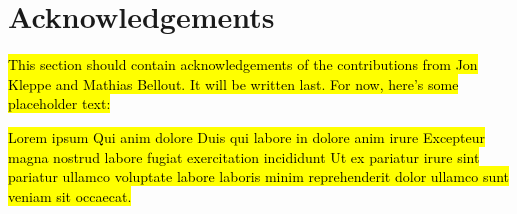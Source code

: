 
\section*{Acknowledgements} %
\hl{This section should contain acknowledgements of the contributions from Jon Kleppe and Mathias Bellout. It will be written last. For now, here's some placeholder text:}

\hl{Lorem ipsum Qui anim dolore Duis qui labore in dolore anim irure Excepteur magna nostrud labore fugiat exercitation incididunt Ut ex pariatur irure sint pariatur ullamco voluptate labore laboris minim reprehenderit dolor ullamco sunt veniam sit occaecat.}
